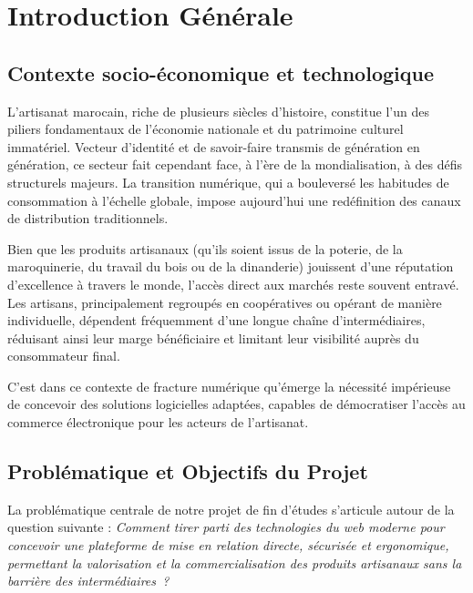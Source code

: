 \chapter*{Introduction Générale}

\section*{Contexte socio-économique et technologique}
L'artisanat marocain, riche de plusieurs siècles d'histoire, constitue l'un des piliers fondamentaux de l'économie nationale et du patrimoine culturel immatériel. Vecteur d'identité et de savoir-faire transmis de génération en génération, ce secteur fait cependant face, à l'ère de la mondialisation, à des défis structurels majeurs. La transition numérique, qui a bouleversé les habitudes de consommation à l'échelle globale, impose aujourd'hui une redéfinition des canaux de distribution traditionnels. 

Bien que les produits artisanaux (qu'ils soient issus de la poterie, de la maroquinerie, du travail du bois ou de la dinanderie) jouissent d'une réputation d'excellence à travers le monde, l'accès direct aux marchés reste souvent entravé. Les artisans, principalement regroupés en coopératives ou opérant de manière individuelle, dépendent fréquemment d'une longue chaîne d'intermédiaires, réduisant ainsi leur marge bénéficiaire et limitant leur visibilité auprès du consommateur final.

C'est dans ce contexte de fracture numérique qu'émerge la nécessité impérieuse de concevoir des solutions logicielles adaptées, capables de démocratiser l'accès au commerce électronique pour les acteurs de l'artisanat.

\section*{Problématique et Objectifs du Projet}

\begin{accentbox}
\textnormal{La problématique centrale de notre projet de fin d'études s'articule autour de la question suivante :} \textit{Comment tirer parti des technologies du web moderne pour concevoir une plateforme de mise en relation directe, sécurisée et ergonomique, permettant la valorisation et la commercialisation des produits artisanaux sans la barrière des intermédiaires~?}
\end{accentbox}

